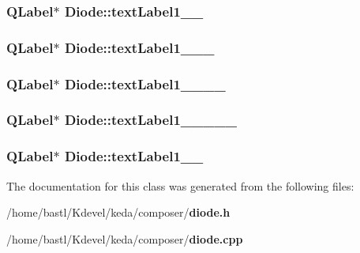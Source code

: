 \subsubsection{\setlength{\rightskip}{0pt plus 5cm}QLabel$\ast$ {\bf Diode::text\-Label1\_\_}}\label{classDiode_3fe321d3c6659a5a3747ba784eb9506e}


\subsubsection{\setlength{\rightskip}{0pt plus 5cm}QLabel$\ast$ {\bf Diode::text\-Label1\_\_\_}}\label{classDiode_1671a2e501448b4b1568b77eb64cf336}


\subsubsection{\setlength{\rightskip}{0pt plus 5cm}QLabel$\ast$ {\bf Diode::text\-Label1\_\_\_\_}}\label{classDiode_96ffffe38a93057d78d008667f175674}


\subsubsection{\setlength{\rightskip}{0pt plus 5cm}QLabel$\ast$ {\bf Diode::text\-Label1\_\_\_\_\_}}\label{classDiode_1ad3f9e228b8b0abe891eb8deec09542}


\subsubsection{\setlength{\rightskip}{0pt plus 5cm}QLabel$\ast$ {\bf Diode::text\-Label1\_\_}}\label{classDiode_fe5af8d88934b635303f290c67eddf11}




The documentation for this class was generated from the following files:\begin{CompactItemize}
\item 
/home/bastl/Kdevel/keda/composer/{\bf diode.h}\item 
/home/bastl/Kdevel/keda/composer/{\bf diode.cpp}\end{CompactItemize}
